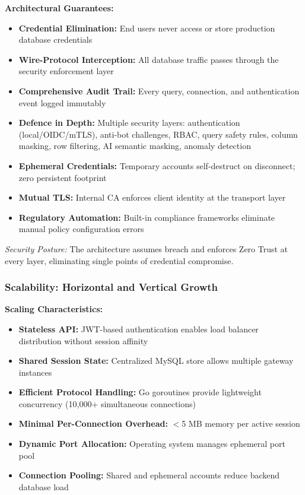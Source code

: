 \textbf{Architectural Guarantees:}
\begin{itemize}[leftmargin=*]
    \item \textbf{Credential Elimination:} End users never access or store production database credentials
    \item \textbf{Wire-Protocol Interception:} All database traffic passes through the security enforcement layer
    \item \textbf{Comprehensive Audit Trail:} Every query, connection, and authentication event logged immutably
    \item \textbf{Defence in Depth:} Multiple security layers: authentication (local/OIDC/mTLS), anti-bot challenges, RBAC, query safety rules, column masking, row filtering, AI semantic masking, anomaly detection
    \item \textbf{Ephemeral Credentials:} Temporary accounts self-destruct on disconnect; zero persistent footprint
    \item \textbf{Mutual TLS:} Internal CA enforces client identity at the transport layer
    \item \textbf{Regulatory Automation:} Built-in compliance frameworks eliminate manual policy configuration errors
\end{itemize}

\textit{Security Posture:} The architecture assumes breach and enforces Zero Trust at every layer, eliminating single points of credential compromise.

\subsubsection{Scalability: Horizontal and Vertical Growth}

\textbf{Scaling Characteristics:}
\begin{itemize}[leftmargin=*]
    \item \textbf{Stateless API:} JWT-based authentication enables load balancer distribution without session affinity
    \item \textbf{Shared Session State:} Centralized MySQL store allows multiple gateway instances
    \item \textbf{Efficient Protocol Handling:} Go goroutines provide lightweight concurrency (10,000+ simultaneous connections)
    \item \textbf{Minimal Per-Connection Overhead:} $<$5 MB memory per active session
    \item \textbf{Dynamic Port Allocation:} Operating system manages ephemeral port pool
    \item \textbf{Connection Pooling:} Shared and ephemeral accounts reduce backend database load
\end{itemize}

